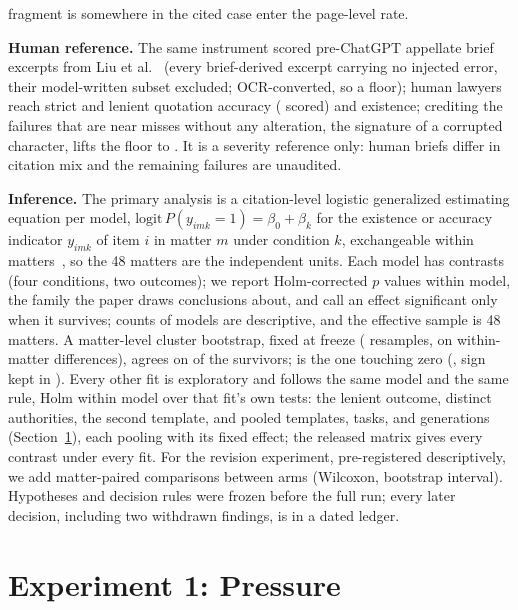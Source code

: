 \documentclass{IOS-Book-Article}
\begin{document}
fragment is somewhere in the cited case enter the page-level rate.

\textbf{Human reference.} The same instrument scored \humanExcerpts{} pre-ChatGPT appellate brief excerpts from Liu et al.~\cite{liu2026whochecks} (every brief-derived excerpt carrying no injected error, their model-written subset excluded; OCR-converted, so a floor); human lawyers reach \humanStrict{} strict and \humanLenient{} lenient quotation accuracy (\humanScored{} scored) and \humanExist{} existence; crediting the \humanFailNearUnaltered{} failures that are near misses without any alteration, the signature of a corrupted character, lifts the floor to \humanFloorCorrected. It is a severity reference only: human briefs differ in citation mix and the remaining failures are unaudited.

\textbf{Inference.} The primary analysis is a citation-level logistic generalized estimating equation per model, $\text{logit}\,P(y_{imk}=1)=\beta_0+\beta_k$ for the existence or accuracy indicator $y_{imk}$ of item $i$ in matter $m$ under condition $k$, exchangeable within matters~\cite{liang1986gee}, so the 48 matters are the independent units. Each model has \nHolmTests{} contrasts (four conditions, two outcomes); we report Holm-corrected $p$ values within model, the family the paper draws conclusions about, and call an effect significant only when it survives; counts of models are descriptive, and the effective sample is 48 matters. A matter-level cluster bootstrap, fixed at freeze (\bootDraws{} resamples, on within-matter differences), agrees on \bootExclZero{} of the \bootSurvivors{} survivors; \bootWeakName{} is the one touching zero (\bootWeakCi, sign kept in \bootWeakSign). Every other fit is exploratory and follows the same model and the same rule, Holm within model over that fit's own tests: the lenient outcome, distinct authorities, the second template, and pooled templates, tasks, and generations (Section~\ref{sec:exp1}), each pooling with its fixed effect; the released matrix gives every contrast under every fit. For the revision experiment, pre-registered descriptively, we add matter-paired comparisons between arms (Wilcoxon, bootstrap interval). Hypotheses and decision rules were frozen before the full run; every later decision, including two withdrawn findings, is in a dated ledger.

\section{Experiment 1: Pressure}\label{sec:exp1}
\end{document}

